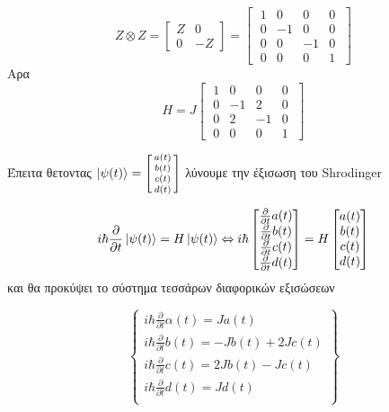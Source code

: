 \documentclass[12pt]{article}
\begin{document}
$$Z\otimes Z  =\begin{bmatrix}
    Z & 0 \\ 
    0 & -Z
\end{bmatrix}= \begin{bmatrix}
    \;1 & 0& 0& 0 \;\\ 
    \;0 & -1& 0& 0\;\\
    \;0 & 0&-1& 0\;\\
    \;0 & 0& 0& 1\;
\end{bmatrix}$$
Αρα $$Η = J\begin{bmatrix}
    \;1 & 0& 0& 0 \;\\ 
    \;0 & -1& 2& 0\;\\
    \;0 & 2&-1& 0\;\\
    \;0 & 0& 0& 1\;
\end{bmatrix} $$


Έπειτα θετοντας $\ket{\psi(t)} = \begin{bsmallmatrix}
    a(t)\\ 
    b(t)\\
    c(t)\\
    d(t)\\
\end{bsmallmatrix}$  λύνουμε την έξισωση του \textlatin{Shrodinger}

$$i\hbar \frac{\partial}{\partial t} \ket{\psi(t)} = H\ket{\psi(t)}\Leftrightarrow i\hbar \begin{bmatrix}
    \frac{\partial}{\partial t}a(t)\\ 
    \frac{\partial}{\partial t}b(t)\\
    \frac{\partial}{\partial t}c(t)\\
    \frac{\partial}{\partial t}d(t)\\
\end{bmatrix}=H\begin{bmatrix}
    a(t)\\ 
    b(t)\\
    c(t)\\
    d(t)\\
\end{bmatrix}$$
και θα προκύψει το σύστημα τεσσάρων διαφορικών εξισώσεων 

$$\left\{
    \begin{array}{lr}
        i\hbar\frac{\partial}{\partial t}\alpha(t) =  J a(t)\\
        i\hbar\frac{\partial}{\partial t}b(t) =  -J b(t) +2Jc(t)\\
        i\hbar\frac{\partial}{\partial t}c(t) =  2J b(t) -Jc(t)\\
        i\hbar\frac{\partial}{\partial t}d(t) =  J d(t)\\
    \end{array}
    \right\} $$
\end{document}
